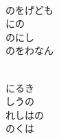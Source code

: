 \documentclass[10pt,b5j]{tarticle} %
\begin{document}
\begin{enumerate}
\begin{minipage}[c]{\blocksize}
        \vspace{\linespace}
        \item~\\
        のをげども\\
        にの\\
        のにし\\
        のをわなん
        
        \vspace{\linespace}
        \item~\\
        にるき\\
        しうの\\
        れしはの\\
        のくは
    
    \end{minipage}
\end{enumerate} %
\end{document}

